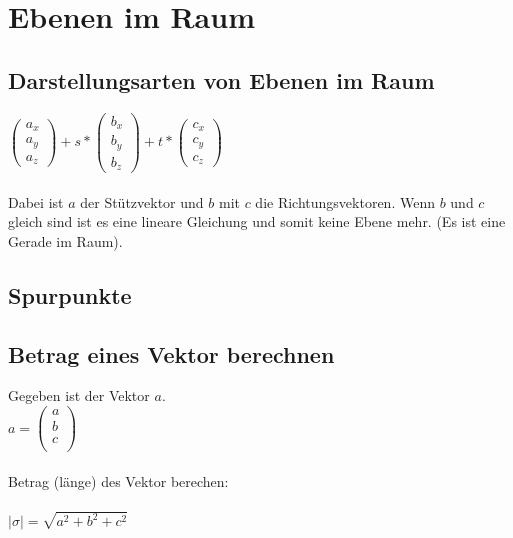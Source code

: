 
\section{Ebenen im Raum}
\subsection{Darstellungsarten von Ebenen im Raum}
$
\begin{pmatrix}
    a_x \\ a_y \\ a_z
\end{pmatrix}
+ s * 
\begin{pmatrix}
    b_x \\ b_y \\ b_z
\end{pmatrix}
+ t * 
\begin{pmatrix}
    c_x \\ c_y \\ c_z
\end{pmatrix}
$ 
\\\\
Dabei ist $a$ der Stützvektor und $b$ mit $c$ die Richtungsvektoren.
Wenn $b$ und $c$ gleich sind ist es eine lineare Gleichung und somit keine Ebene mehr. 
(Es ist eine Gerade im Raum).

\subsection{Spurpunkte}

\subsection{Betrag eines Vektor berechnen}
Gegeben ist der Vektor $a$. \\
$
a = 
\begin{pmatrix}
    a \\ b \\ c \\
\end{pmatrix}
$ 
\\\\
Betrag (länge) des Vektor berechen: \\\\
$
|\sigma| = \sqrt{a^2 + b^2 + c^2}
$



